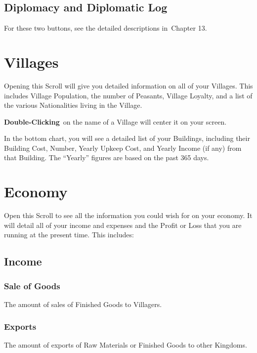 \subsection{Diplomacy and Diplomatic Log}

For these two buttons, see the detailed descriptions in Chapter 13.

\section{Villages}

Opening this Scroll will give you detailed information on all of your Villages. This includes Village Population, the number of Peasants, Village Loyalty, and a list of the various Nationalities living in the Village.

\textbf{Double-Clicking} on the name of a Village will center it on your screen.

In the bottom chart, you will see a detailed list of your Buildings, including their Building Cost, Number, Yearly Upkeep Cost, and Yearly Income (if any) from that Building. The “Yearly” figures are based on the past 365 days.

\section{Economy}


Open this Scroll to see all the information you could wish for on your economy. It will detail all of your income and expenses and the Profit or Loss that you are running at the present time. This includes:

\subsection{Income}


\subsubsection{Sale of Goods}

The amount of sales of Finished Goods to Villagers.

\subsubsection{Exports}

The amount of exports of Raw Materials or Finished Goods to other Kingdoms.

